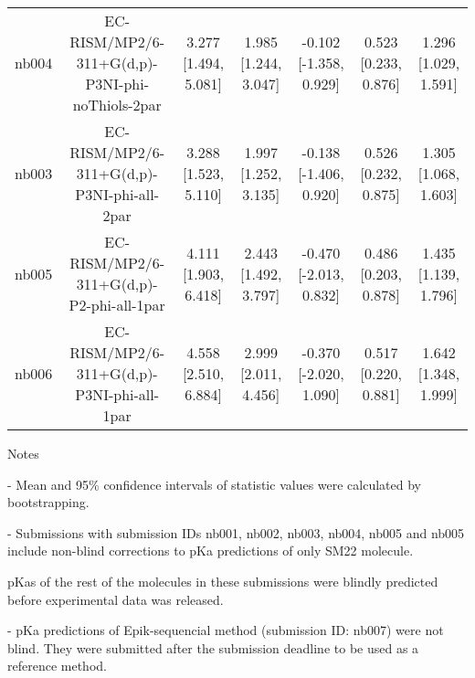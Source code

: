 \documentclass{article}
\begin{document}
\begin{center}
\begin{longtable}{|ccccccc|}
 nb004 &    EC-RISM/MP2/6-311+G(d,p)-P3NI-phi-noThiols-2par &  3.277 [1.494, 5.081] &  1.985 [1.244, 3.047] &   -0.102 [-1.358, 0.929] &  0.523 [0.233, 0.876] &   1.296 [1.029, 1.591] \\
 nb003 &         EC-RISM/MP2/6-311+G(d,p)-P3NI-phi-all-2par &  3.288 [1.523, 5.110] &  1.997 [1.252, 3.135] &   -0.138 [-1.406, 0.920] &  0.526 [0.232, 0.875] &   1.305 [1.068, 1.603] \\
 nb005 &           EC-RISM/MP2/6-311+G(d,p)-P2-phi-all-1par &  4.111 [1.903, 6.418] &  2.443 [1.492, 3.797] &   -0.470 [-2.013, 0.832] &  0.486 [0.203, 0.878] &   1.435 [1.139, 1.796] \\
 nb006 &         EC-RISM/MP2/6-311+G(d,p)-P3NI-phi-all-1par &  4.558 [2.510, 6.884] &  2.999 [2.011, 4.456] &   -0.370 [-2.020, 1.090] &  0.517 [0.220, 0.881] &   1.642 [1.348, 1.999] \\
\end{longtable}
\end{center}

Notes

- Mean and 95\% confidence intervals of statistic values were calculated by bootstrapping.

- Submissions with submission IDs nb001, nb002, nb003, nb004, nb005 and nb005 include non-blind corrections to pKa predictions of only SM22 molecule.

pKas of the rest of the molecules in these submissions were blindly predicted before experimental data was released.

- pKa predictions of Epik-sequencial method (submission ID: nb007) were not blind. They were submitted after the submission deadline to be used as a reference method.
\end{document}

